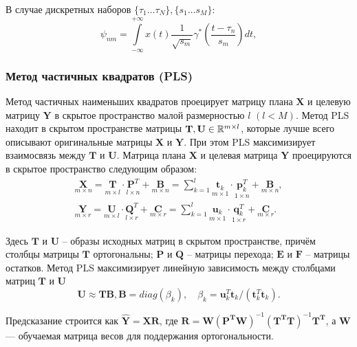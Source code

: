 \documentclass[12pt, twoside]{article}
\begin{document}
В случае дискретных наборов $\{\tau_1 \ldots \tau_N\}, \{s_1 \ldots s_M \}$:
\[
	\psi_{nm} = \int \limits _{{-\infty }}^{{+\infty }}x(t){\frac  {1}{{\sqrt  {s_m}}}}\gamma ^{{*}}\left({\frac  {t-\tau_n }{s_m}}\right)dt,	
\]
\subsubsection{Метод частичных квадратов (PLS)}

Метод частичных наименьших квадратов проецирует матрицу плана $\mathbf{X}$ и целевую
 матрицу $\mathbf{Y}$ в скрытое пространство малой размерностью $l$ $(l < M)$. Метод PLS находит в скрытом пространстве матрицы $\mathbf{T}, \mathbf{U} \in \RR
^{m\times l}$, которые лучше всего описывают оригинальные матрицы $\mathbf{X}$ и $\mathbf{Y}$. При этом PLS максимизирует взаимосвязь между $\mathbf{T}$ и $\mathbf{U}$.
Матрица плана $\mathbf{X}$ и целевая матрица $\mathbf{Y}$ проецируются в скрытое пространство следующим образом:
\begin{equation*}
\begin{split}
\underset{m\times n
}{\mathbf{X}}= \underset{m\times l}{\mathbf{T}} \cdot \underset{l\times n
}{\mathbf{P}^T}
+ \underset{m\times n}{\mathbf{B}}
=
\sum_{k=1}^{l}
\underset{m\times 1}{\mathbf{t}_k}
\cdot\underset{1\times n}{\mathbf{p}^T_k}
+ \underset{m\times n}{\mathbf{B}}
, 
\\ 
\underset{m\times r}{\mathbf{Y}}
= \underset{m\times l}{\mathbf{U}} \cdot \underset{l\times r
}{\mathbf{Q}^T}
+ \underset{m\times r
}{\mathbf{C}}= \sum_{k=1}^l
\underset{m\times 1}{\mathbf{u}_k} \cdot \underset{1\times r}{\mathbf{q}^T_k}
+ \underset{m\times r}{\mathbf{C}}.
\end{split}
\end{equation*}

Здесь $\mathbf{T}$ и $\mathbf{U}$ – образы исходных матриц в скрытом пространстве, причём столбцы матрицы
$\mathbf{T}$ ортогональны; $\mathbf{P}$ и $\mathbf{Q}$ – матрицы перехода; $\mathbf{E}$ и $\mathbf{F}$ – матрицы остатков. Метод PLS
максимизирует линейную зависимость между столбцами матриц $\mathbf{T}$ и $\mathbf{U}$
\[\mathbf{U} \approx \mathbf{TB}, \mathbf{B} = diag(\beta_k), \quad \beta_k = \mathbf{u}^T_k 
\mathbf{t}_k/(\mathbf{t}^T_k\mathbf{
t}_k).
\]

Предсказание строится как $\hat{\mathbf{Y}} = \mathbf{XR}$, где $\mathbf{R} = \mathbf{W(P^TW)}^{-1}\mathbf{(T^TT)}^{-1}\mathbf{T^T}$, а $\mathbf{W}$ --- обучаемая матрица весов для поддержания ортогональности.
\end{document}
